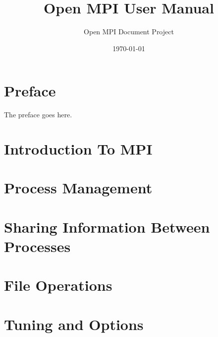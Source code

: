 \documentclass[12pt,twoside]{book}
\begin{document}
\frontmatter

\title{Open MPI User Manual}
\author{Open MPI Document Project}
\date{\today}
\maketitle

\tableofcontents

\chapter{Preface}

The preface goes here.

\mainmatter

\chapter{Introduction To MPI}


\chapter{Process Management}


\chapter{Sharing Information Between Processes}


\chapter{File Operations}


\chapter{Tuning and Options}


\backmatter
\end{document}
